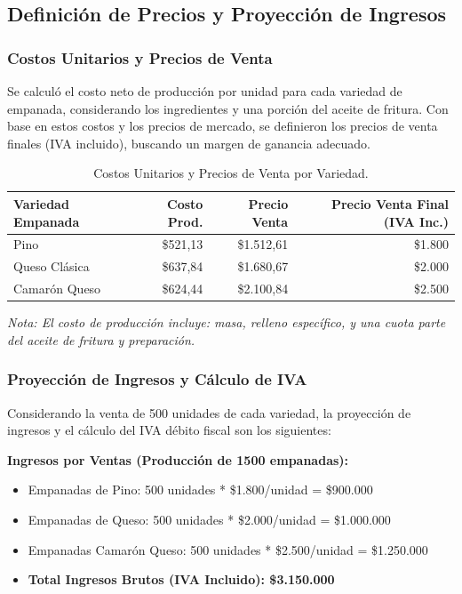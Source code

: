 \documentclass[12pt]{article}
\begin{document}
    \subsection{Definición de Precios y Proyección de Ingresos}
        \subsubsection{Costos Unitarios y Precios de Venta}
        Se calculó el costo neto de producción por unidad para cada variedad de empanada, considerando los ingredientes y una porción del aceite de fritura. Con base en estos costos y los precios de mercado, se definieron los precios de venta finales (IVA incluido), buscando un margen de ganancia adecuado.

        \begin{table}[H]
            \centering
            \small
            \begin{tabular}{|l|r|r|r|}
                \hline
                \textbf{Variedad Empanada} & \textbf{Costo Prod.} & \textbf{Precio Venta} & \textbf{Precio Venta Final (IVA Inc.)} \\
                \hline
                Pino & \$521,13 & \$1.512,61 & \$1.800 \\
                Queso Clásica & \$637,84 & \$1.680,67 & \$2.000 \\
                Camarón Queso & \$624,44 & \$2.100,84 & \$2.500 \\
                \hline
            \end{tabular}
            \caption{Costos Unitarios y Precios de Venta por Variedad.}
            \label{tab:precios_venta}
        \end{table}
        \textit{Nota: El costo de producción incluye: masa, relleno específico, y una cuota parte del aceite de fritura y preparación.}

        \subsubsection{Proyección de Ingresos y Cálculo de IVA}
        Considerando la venta de 500 unidades de cada variedad, la proyección de ingresos y el cálculo del IVA débito fiscal son los siguientes:

        \textbf{Ingresos por Ventas (Producción de 1500 empanadas):}
        \begin{itemize}
            \item Empanadas de Pino: 500 unidades * \$1.800/unidad = \$900.000
            \item Empanadas de Queso: 500 unidades * \$2.000/unidad = \$1.000.000
            \item Empanadas Camarón Queso: 500 unidades * \$2.500/unidad = \$1.250.000
            \item \textbf{Total Ingresos Brutos (IVA Incluido): \$3.150.000}
        \end{itemize}
\end{document}

